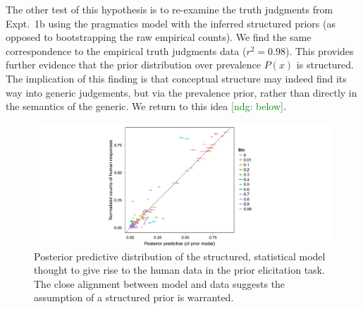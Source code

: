\documentclass[12pt,letterpaper]{article}
\newcommand{\ndg}[1]{\textcolor{Green}{[ndg: #1]}}
\begin{document}
The other test of this hypothesis is to re-examine the truth judgments from Expt.~1b using the pragmatics model with the inferred structured priors (as opposed to bootstrapping the raw empirical counts). 
We find the same correspondence to the empirical truth judgments data ($r^2 = 0.98$).
This provides further evidence that the prior distribution over prevalence $P(x)$ is structured.
The implication of this finding is that conceptual structure may indeed find its way into generic judgements, but via the prevalence prior, rather than directly in the semantics of the generic. We return to this idea \ndg{below}.


\begin{figure}
\centering
    \includegraphics[width=0.6\columnwidth]{postPred-priorModel.pdf}
    \caption{Posterior predictive distribution of the structured, statistical model thought to give rise to the human data in the prior elicitation task. The close alignment between model and data suggests the assumption of a structured prior is warranted.}
  \label{fig:pp-priorModel}
\end{figure}

\end{document}
